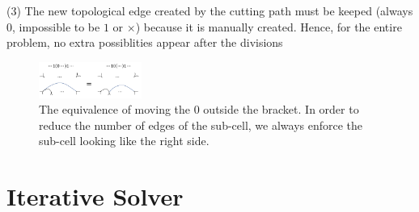 \documentclass[journal]{IEEEtran}
\begin{document}
(3) The new topological edge created by the cutting path must be keeped (always $0$, impossible to be $1$ or $\times$) because it is manually created. Hence, for the entire problem, no extra possiblities appear after the divisions 

\begin{figure}[t]
\centering
\includegraphics[width = 0.3\textwidth]{proof/equiv_zero}
\caption{The equivalence of moving the $0$ outside the bracket. In order to reduce the number of edges of the sub-cell, we always enforce the sub-cell looking like the right side. }\label{figconstraint}
\end{figure} 



\section{Iterative Solver}\label{sectioniterativesolver}

\end{document}
